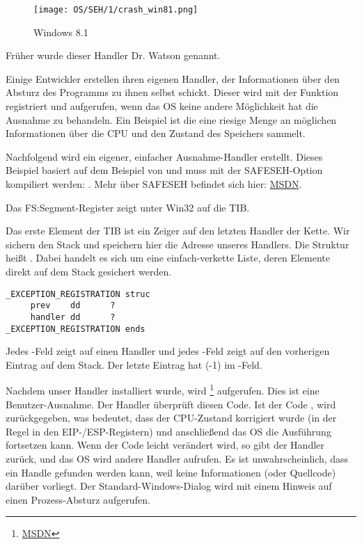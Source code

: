 \begin{figure}[H]
\centering
\texttt{[image: OS/SEH/1/crash\_win81.png]}
\caption{Windows 8.1}
\end{figure}

Früher wurde dieser Handler Dr. Watson
genannt.

Einige Entwickler erstellen ihren eigenen Handler, der Informationen über den Absturz
des Programms zu ihnen selbst schickt.
Dieser wird mit der Funktion  registriert und aufgerufen,
wenn das \ac{OS} keine andere Möglichkeit hat die Ausnahme zu behandeln.
\myindex{\oracle}
Ein Beispiel ist \oracle die eine riesige Menge an möglichen Informationen über die \ac{CPU}
und den Zustand des Speichers sammelt.

Nachfolgend wird ein eigener, einfacher Ausnahme-Handler erstellt.
Dieses Beispiel basiert auf dem Beispiel von \PietrekSEH und muss mit der SAFESEH-Option
kompiliert werden: .
Mehr über SAFESEH befindet sich hier: \href{http://go.yurichev.com/17252}{MSDN}.



Das FS:Segment-Register zeigt unter Win32 auf die \ac{TIB}.

Das erste Element der \ac{TIB} ist ein Zeiger auf den letzten Handler der Kette.
Wir sichern den Stack und speichern hier die Adresse unseres Handlers.
Die Struktur heißt . Dabei handelt es sich um eine
einfach-verkette Liste, deren Elemente direkt auf dem Stack gesichert werden.

\begin{lstlisting}[caption=MSVC/VC/crt/src/exsup.inc,style=customasmx86]
_EXCEPTION_REGISTRATION struc
     prev    dd      ?
     handler dd      ?
_EXCEPTION_REGISTRATION ends
\end{lstlisting}

Jedes -Feld zeigt auf einen Handler und jedes -Feld zeigt auf den
vorherigen Eintrag auf dem Stack.
Der letzte Eintrag hat  (-1) im -Feld.



Nachdem unser Handler installiert wurde, wird 
\footnote{\href{http://go.yurichev.com/17253}{MSDN}} aufgerufen.
Dies ist eine Benutzer-Ausnahme.
Der Handler überprüft diesen Code.
Ist der Code , wird  zurückgegeben,
was bedeutet, dass der CPU-Zustand korrigiert wurde (in der Regel in den EIP-/ESP-Registern)
und anschließend das \ac{OS} die Ausführung fortsetzen kann.
Wenn der Code leicht verändert wird, so gibt der Handler  zurück,
und das \ac{OS} wird andere Handler aufrufen.
Es ist unwahrscheinlich, dass ein Handle gefunden werden kann, weil keine Informationen
(oder Quellcode) darüber vorliegt.
Der Standard-Windows-Dialog wird mit einem Hinweis auf einen Prozess-Absturz aufgerufen.

